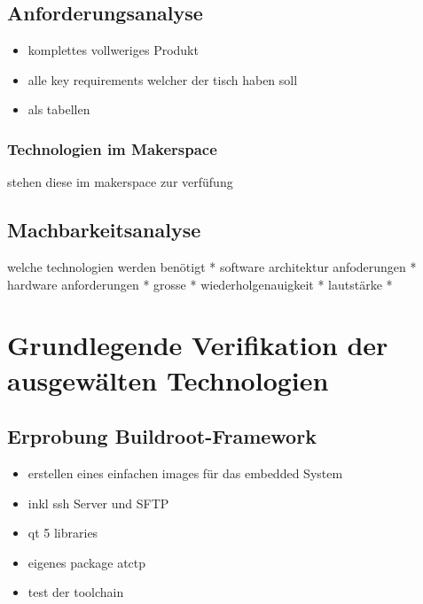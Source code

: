 \hypertarget{anforderungsanalyse}{%
\subsection{Anforderungsanalyse}\label{anforderungsanalyse}}

\begin{itemize}
\tightlist
\item
  komplettes vollweriges Produkt
\item
  alle key requirements welcher der tisch haben soll
\item
  als tabellen
\end{itemize}

\hypertarget{technologien-im-makerspace}{%
\subsubsection{Technologien im
Makerspace}\label{technologien-im-makerspace}}

stehen diese im makerspace zur verfüfung

\hypertarget{machbarkeitsanalyse}{%
\subsection{Machbarkeitsanalyse}\label{machbarkeitsanalyse}}

welche technologien werden benötigt * software architektur anfoderungen
* hardware anforderungen * grosse * wiederholgenauigkeit * lautstärke *

\hypertarget{grundlegende-verifikation-der-ausgewuxe4lten-technologien}{%
\section{Grundlegende Verifikation der ausgewälten
Technologien}\label{grundlegende-verifikation-der-ausgewuxe4lten-technologien}}

\hypertarget{erprobung-buildroot-framework}{%
\subsection{Erprobung
Buildroot-Framework}\label{erprobung-buildroot-framework}}

\begin{itemize}
\tightlist
\item
  erstellen eines einfachen images für das embedded System
\item
  inkl ssh Server und SFTP
\item
  qt 5 libraries
\item
  eigenes package atctp
\item
  test der toolchain
\end{itemize}


